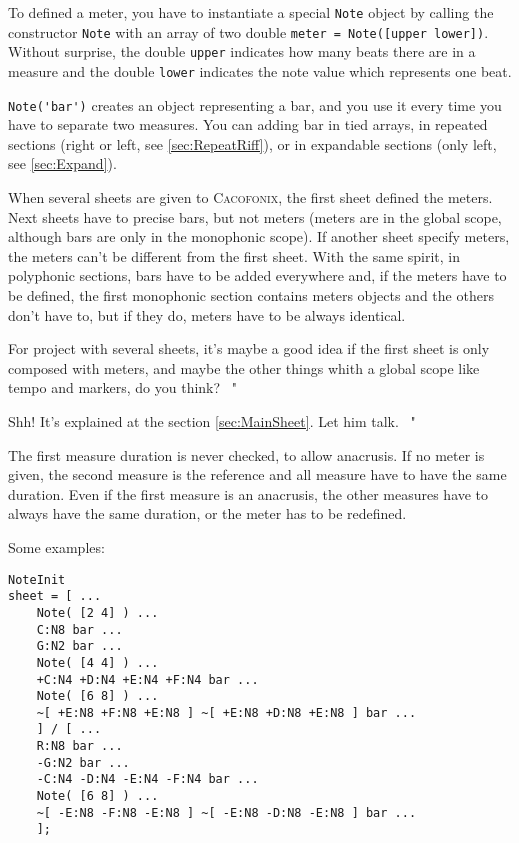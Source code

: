\documentclass{article}
\newcommand\cacofonix{\textsc{Cacofonix}\xspace}
\newcommand\note{\lstinline!Note!\xspace}
\newenvironment{meenv}{ \par \noindent \makebox[6em][r]{ \textcolor{mecolor}{Me}: " --~}}{~"}
\newenvironment{myselfenv}{ \par \noindent \makebox[6em][r]{ \textcolor{myselfcolor}{Myself}: " --~}}{~"}
\newcommand{ \me }[1]{%
\begin{meenv}%
	#1%
\end{meenv} }
\newcommand{ \myself }[1]{%
\begin{myselfenv}%
	#1%
\end{myselfenv} }
\begin{document}
To defined a meter, you have to instantiate a special \note object by calling the constructor \lstinline!Note! with an array of two double \lstinline!meter = Note([upper lower])!. Without surprise, the double \lstinline!upper! indicates how many beats there are in a measure and the double \lstinline!lower! indicates the note value which represents one beat.

\lstinline!Note('bar')! creates an object representing a bar, and you use it every time you have to separate two measures. You can adding bar in tied arrays, in repeated sections (right or left, see \ref{sec:RepeatRiff}), or in expandable sections (only left, see \ref{sec:Expand}).

When several sheets are given to \cacofonix, the first sheet defined the meters. Next sheets have to precise bars, but not meters (meters are in the global scope, although bars are only in the monophonic scope). If another sheet specify meters, the meters can't be different from the first sheet. With the same spirit, in polyphonic sections, bars have to be added everywhere and, if the meters have to be defined, the first monophonic section contains meters objects and the others don't have to, but if they do, meters have to be always identical.

\me{For project with several sheets, it's maybe a good idea if the first sheet is only composed with meters, and maybe the other things whith a global scope like tempo and markers, do you think?}
\myself{Shh! It's explained at the section \ref{sec:MainSheet}. Let him talk.}

The first measure duration is never checked, to allow anacrusis. If no meter is given, the second measure is the reference and all measure have to have the same duration. Even if the first measure is an anacrusis, the other measures have to always have the same duration, or the meter has to be redefined.

Some examples: \\

\begin{lstlisting}
NoteInit
sheet = [ ...
	Note( [2 4] ) ...
	C:N8 bar ...
	G:N2 bar ...
	Note( [4 4] ) ...
	+C:N4 +D:N4 +E:N4 +F:N4 bar ...
	Note( [6 8] ) ...
	~[ +E:N8 +F:N8 +E:N8 ] ~[ +E:N8 +D:N8 +E:N8 ] bar ...
	] / [ ...
	R:N8 bar ...
	-G:N2 bar ...
	-C:N4 -D:N4 -E:N4 -F:N4 bar ...
	Note( [6 8] ) ...
	~[ -E:N8 -F:N8 -E:N8 ] ~[ -E:N8 -D:N8 -E:N8 ] bar ...
	];
\end{lstlisting}
\end{document}
